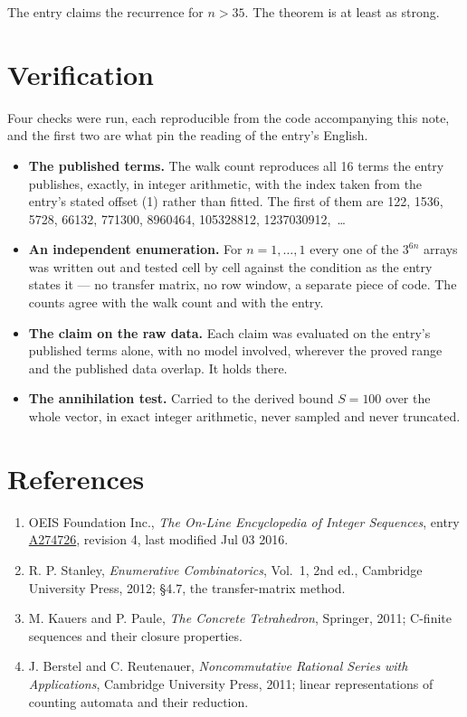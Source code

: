 \documentclass[11pt]{article}
\theoremstyle{definition}
\begin{document}
The entry claims the recurrence for $n > 35$. The theorem is at least as strong.

\section{Verification}

Four checks were run, each reproducible from the code accompanying this note, and the first two are what pin the reading of the entry's English.

\begin{itemize}

\item {\bfseries The published terms.} The walk count reproduces all 16 terms the entry publishes, exactly, in integer arithmetic, with the index taken from the entry's stated offset (1) rather than fitted. The first of them are 122, 1536, 5728, 66132, 771300, 8960464, 105328812, 1237030912,~\dots

\item {\bfseries An independent enumeration.} For $n = 1,\dots,1$ every one of the $3^{6n}$ arrays was written out and tested cell by cell against the condition as the entry states it --- no transfer matrix, no row window, a separate piece of code. The counts agree with the walk count and with the entry.

\item {\bfseries The claim on the raw data.} Each claim was evaluated on the entry's published terms alone, with no model involved, wherever the proved range and the published data overlap. It holds there.

\item {\bfseries The annihilation test.} Carried to the derived bound $S = 100$ over the whole vector, in exact integer arithmetic, never sampled and never truncated.

\end{itemize}

\section{References}

\begin{enumerate}

\item OEIS Foundation Inc., \emph{The On-Line Encyclopedia of Integer Sequences}, entry \href{https://oeis.org/A274726}{A274726}, revision 4, last modified Jul 03 2016.

\item R. P. Stanley, \emph{Enumerative Combinatorics}, Vol.~1, 2nd ed., Cambridge University Press, 2012; \S4.7, the transfer-matrix method.

\item M. Kauers and P. Paule, \emph{The Concrete Tetrahedron}, Springer, 2011; C-finite sequences and their closure properties.

\item J. Berstel and C. Reutenauer, \emph{Noncommutative Rational Series with Applications}, Cambridge University Press, 2011; linear representations of counting automata and their reduction.

\end{enumerate}
\end{document}
